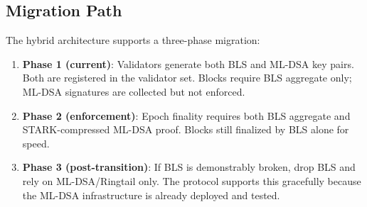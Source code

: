 \subsection{Migration Path}

The hybrid architecture supports a three-phase migration:

\begin{enumerate}[leftmargin=2em]
  \item \textbf{Phase 1 (current)}: Validators generate both BLS and ML-DSA key pairs.
        Both are registered in the validator set. Blocks require BLS aggregate only;
        ML-DSA signatures are collected but not enforced.
  \item \textbf{Phase 2 (enforcement)}: Epoch finality requires both BLS aggregate
        and STARK-compressed ML-DSA proof. Blocks still finalized by BLS alone
        for speed.
  \item \textbf{Phase 3 (post-transition)}: If BLS is demonstrably broken, drop BLS
        and rely on ML-DSA/Ringtail only. The protocol supports this gracefully because
        the ML-DSA infrastructure is already deployed and tested.
\end{enumerate}


